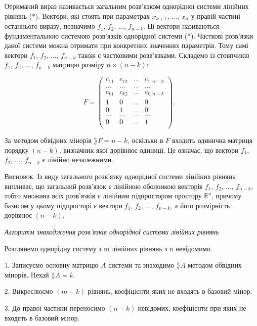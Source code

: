 Отриманий вираз називається загальним розв’язком однорідної системи
лінійних рівнянь (*). Вектори, які стоять при параметрах $x_{k+1}$, ..., $x_{n}$ у правій
частині останнього виразу, позначимо $f_1$, $f_2$, ..., $f_{n-k}$. Ці вектори називаються
фундаментальною системою розв’язків однорідної системи (*). Часткові 
розв’язки даної системи можна отримати при конкретних значеннях параметрів.
Тому самі вектори $f_1$, $f_2$, ..., $f_{n-k}$ також є частковими розв’язками.
Складемо із стовпчиків $f_1$, $f_2$, ..., $f_{n-k}$ матрицю розміру $n \times (n - k)$:

$$F = \begin{pmatrix}
	c_{11} & c_{12} & ... & c_{1,n-k} \\
	...    & ...    & ... & ...       \\
	c_{k1} & c_{k2} & ... & c_{k,n-k} \\
	1      & 0      & ... & 0         \\
	0      & 1      & ... & 0         \\
	...    & ...    & ... & ...       \\
	0      & 0      & ... & 1         \\
\end{pmatrix}.$$

За методом обвідних мінорів $\rang F = n - k$, оскільки в $F$ входить одинична
матриця порядку $(n - k)$, визначник якої дорівнює одиниці. Це означає, що вектори
$f_1$, $f_2$, ..., $f_{n-k}$ є лінійно незалежними.


Висновок. Із виду загального розв’язку однорідної системи лінійних рівнянь
випливає, що загальний розв’язок є лінійною оболонкою векторів $f_1$, $f_2$, ..., $f_{n-k}$,
тобто множина всіх розв’язків є лінійним підпростором простору $\mathbb{R}^n$, причому
базисом у цьому підпросторі є вектори $f_1$, $f_2$, ..., $f_{n-k}$, а його розмірність дорівнює
$(n - k)$.


\textit{Алгоритм знаходження розв’язків однорідної системи лінійних рівнянь}


Розглянемо однорідну систему з m лінійних рівнянь з n невідомими.

1. Записуємо основну матрицю $A$ системи та знаходимо $\rang A$ методом
обвідних мінорів. Нехай $\rang A = k$.

2. Викреслюємо $(m - k)$ рівнянь, коефіцієнти яких не входять в базовий мінор.

3. До правої частини переносимо $(n - k)$ невідомих, коефіцієнти при яких не
входять в базовий мінор.

